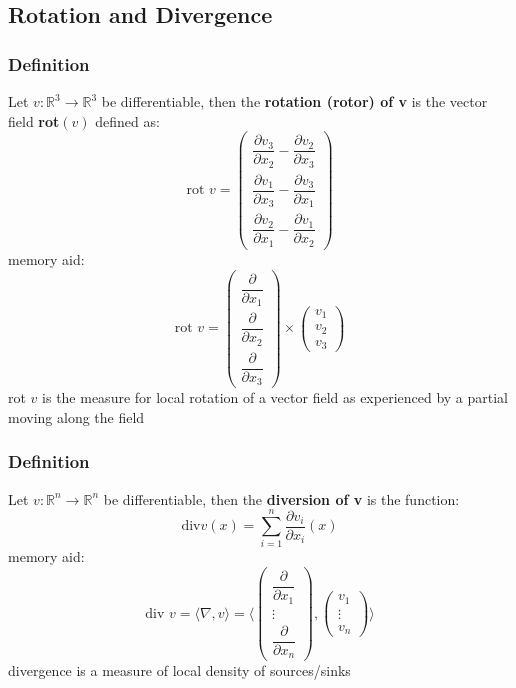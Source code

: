 \documentclass{article}
\begin{document}
\subsection{Rotation and Divergence}
\subsubsection*{Definition}
Let $v : \mathbb{R}^{3} \rightarrow \mathbb{R}^{3}$ be differentiable, then the \textbf{rotation (rotor) of v} is the vector field \textbf{rot}$(v)$ defined as:
\[
\text{rot } v = \begin{pmatrix} \dfrac{\partial v_3}{\partial x_2} - \dfrac{\partial v_2}{\partial x_3} \\ \dfrac{\partial v_1}{\partial x_3} - \dfrac{\partial v_3}{\partial x_1} \\ \dfrac{\partial v_2}{\partial x_1} - \dfrac{\partial v_1}{\partial x_2} \end{pmatrix} 
\]
memory aid: 
\[
\text{rot } v = \begin{pmatrix} \dfrac{\partial}{\partial x_1} \\ \dfrac{\partial}{\partial x_2} \\ \dfrac{\partial}{\partial x_3} \end{pmatrix} \times \begin{pmatrix} v_1 \\ v_2 \\ v_3 \end{pmatrix}
\]
rot $v$ is the measure for local rotation of a vector field as experienced by a partial moving along the field
\subsubsection*{Definition}
Let $v : \mathbb{R}^{n} \rightarrow \mathbb{R}^{n}$ be differentiable, then the \textbf{diversion of v} is the function: 
\[
\text{div} v(x) = \sum_{i = 1}^{n} \dfrac{\partial v_i}{\partial x_i}(x)
\]
memory aid: 
\[
\text{div } v = \langle\nabla, v\rangle = \langle \begin{pmatrix} \dfrac{\partial}{\partial x_1} \\ \vdots \\ \dfrac{\partial}{\partial x_n} \end{pmatrix} , \begin{pmatrix} v_1 \\ \vdots \\ v_n \end{pmatrix} \rangle
\]
divergence is a measure of local density of sources/sinks
\end{document}
